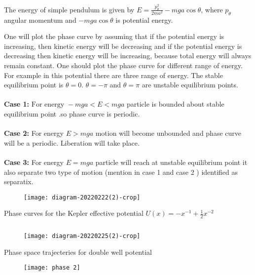 \begin{example}
 The energy of simple pendulum is given by $E=\frac{p_{\theta}^{2}}{2 m a^{2}}-m g a \cos \theta$, where $p_{\theta}$ angular momentum and $-m g a \cos \theta$ is potential energy.
\end{example}
\begin{answer}
	One will plot the phase curve by assuming that if the potential energy is increasing, then kinetic energy will be decreasing and if the potential energy is decreasing then kinetic energy will be increasing, because total energy will always remain constant. One should plot the phase curve for different range of energy. For example in this potential there are three range of energy.
	The stable equilibrium point is $\theta=0$. $\theta=-\pi$ and $\theta=\pi$ are unstable equilibrium points.\\\\
	\textbf{Case 1:}$\text { For energy }-m g a<E<m g a$  particle is bounded about stable equilibrium point .so phase curve is periodic.\\\\
	\textbf{Case 2:} For energy $E>m g a$ motion will become unbounded and phase curve will be a periodic. Liberation will take place.\\\\
	\textbf{Case 3:} For energy $E=m g a$ particle will reach at unstable equilibrium point it also separate two type of motion (mention in case 1 and case 2 ) identified as separatix.
	\begin{figure}[H]
		\centering
		\texttt{[image: diagram-20220222(2)-crop]}
	\end{figure}
\end{answer}
\begin{example}
	Phase curves for the Kepler effective potential $U(x)=-x^{-1}+\frac{1}{2}x^{-2}$
\end{example}
\begin{answer}$\left. \right. $\\
	\begin{figure}[H]
		\centering
		\texttt{[image: diagram-20220225(2)-crop]}
	\end{figure}
\end{answer}
\begin{example}
	Phase space trajecteries for double well potential
\end{example}
\begin{answer}
\begin{figure}[H]
	\centering
	\texttt{[image: phase 2]}
\end{figure}	
\end{answer}
